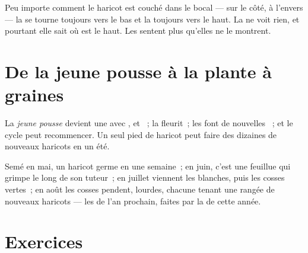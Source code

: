 \begin{remark}\label{rem:g2:from-seed-to-plant:updown}
Peu importe comment le haricot est couché dans le bocal --- sur le
côté, à l'envers --- la  se tourne toujours vers le bas et la
 toujours vers le haut. La  ne voit rien, et pourtant
elle sait où est le haut. Les  sentent plus qu'elles ne le
montrent.
\end{remark}

\section{De la jeune pousse à la plante à graines}

\begin{proposition}\label{prop:g2:from-seed-to-plant:cycle}
La \emph{jeune pousse} devient une  avec
,  et ~; la  fleurit~; les  font de
nouvelles \emph{}~; et le cycle peut recommencer. Un seul pied
de haricot peut faire des dizaines de nouveaux haricots en un été.
\end{proposition}
\admitted

\begin{example}\label{ex:g2:from-seed-to-plant:summer}
Semé en mai, un haricot germe en une semaine~; en juin, c'est une
 feuillue qui grimpe le long de son tuteur~; en juillet
viennent les  blanches, puis les cosses vertes~; en août les
cosses pendent, lourdes, chacune tenant une rangée de nouveaux
haricots --- les  de l'an prochain, faites par la  de
cette année.
\end{example}

\section{Exercices}

